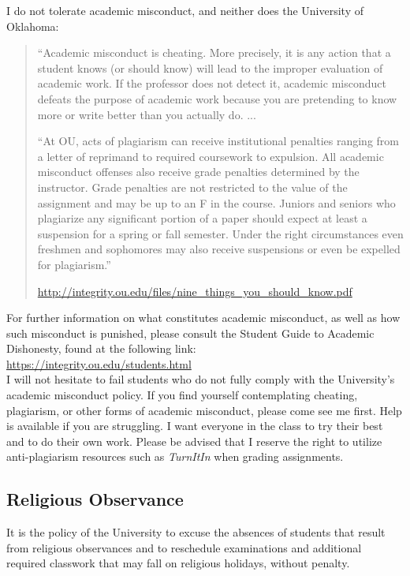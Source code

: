 \documentclass[11pt,english]{article}
\begin{document}
I do not tolerate academic misconduct, and neither does the University of Oklahoma: 
\begin{quotation}
``Academic misconduct is cheating. More precisely, it is any action that a student knows (or should know) will lead to the improper evaluation of academic work. If the professor does not detect it, academic misconduct defeats the purpose of academic work because you are pretending to know more or write better than you actually do. ... 

``At OU, acts of plagiarism can receive institutional penalties ranging from a letter of reprimand to required coursework to expulsion. All academic misconduct offenses also receive grade penalties determined by the instructor. Grade penalties are not restricted to the value of the assignment and may be up to an F in the course. Juniors and seniors who plagiarize any significant portion of a paper should expect at least a suspension for a spring or fall semester. Under the right circumstances even freshmen and sophomores may also receive suspensions or even be expelled for plagiarism.'' 

\textemdash \url{http://integrity.ou.edu/files/nine_things_you_should_know.pdf}
\end{quotation}
For further information on what constitutes academic misconduct, as well as how such misconduct is punished, please consult the Student Guide to Academic Dishonesty, found at the following link:\\ \url{https://integrity.ou.edu/students.html}\\

I will not hesitate to fail students who do not fully comply with the University's academic misconduct policy. If you find yourself contemplating cheating, plagiarism, or other forms of academic misconduct, please come see me first. Help is available if you are struggling. I want everyone in the class to try their best and to do their own work. Please be advised that I reserve the right to utilize anti-plagiarism resources such as \emph{TurnItIn} when grading assignments.

\subsection*{Religious Observance}

It is the policy of the University to excuse the absences of students that result from religious observances and to reschedule examinations and additional required classwork that may fall on religious holidays, without penalty.
\end{document}
